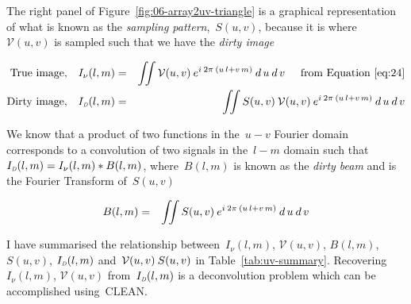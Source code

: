 \documentclass[11pt, a4paper]{article}
\newcommand{\msp}{\mkern \medmuskip}
\begin{document}
The right panel of Figure~\ref{fig:06-array2uv-triangle} is a graphical representation of what is known as the \emph{sampling pattern},~$S(u, v)$, because it is where~$\mathcal{V}(u, v)$ is sampled such that we have the \emph{dirty image}

\begin{eqnarray}
  \label{eq:28}
   \mbox{True image,} \quad I_\nu (l, m) &=& \iint \mathcal{V}(u, v) \msp e^{ i \msp 2\pi \msp (u\,l + v\,m)} \msp d\,u \msp d\,v \hspace{0.5cm} \mbox{from Equation~\eqref{eq:24}} \nonumber \\
   \mbox{Dirty image,} \quad I_{\mbox{\tiny{\emph{D}}}} (l, m) &=& \iint S(u, v) \msp \mathcal{V}(u, v) \msp e^{ i \msp 2\pi \msp (u\,l + v\,m)} \msp d\,u \msp d\,v
\end{eqnarray}

We know that a product of two functions in the~$u-v$ Fourier domain corresponds to a convolution of two signals in the~$l-m$ domain such that~$I_{\mbox{\tiny{\emph{D}}}} (l, m) = I_\nu (l,m) * B(l,m)$, where~$B(l,m)$ is known as the \emph{dirty beam} and is the Fourier Transform of~$S(u, v)$

\begin{eqnarray}
  \label{eq:29}
  B(l,m) &=& \iint S(u, v) \msp e^{ i \msp 2\pi \msp (u\,l + v\,m)} \msp d\,u \msp d\,v \nonumber
\end{eqnarray}

I have summarised the relationship between~$I_\nu (l, m)$, $\mathcal{V}(u,  v)$, $B(l, m)$, $S(u, v)$, $I_{\mbox{\tiny{\emph{D}}}}(l, m)$ and~$\mathcal{V}(u,  v) \msp S(u, v)$ in Table~\ref{tab:uv-summary}. Recovering~$I_\nu (l, m)$, $\mathcal{V}(u,  v)$ from~$I_{\mbox{\tiny{\emph{D}}}}(l, m)$ is a deconvolution problem which can be accomplished using~CLEAN.
\end{document}
